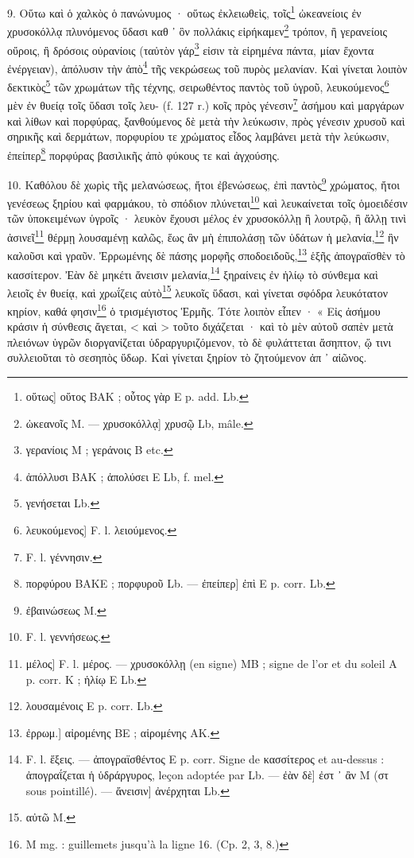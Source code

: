 \documentclass[a4paper, 11pt, oneside, polutonikogreek, french]{article}
\begin{document}
9. Οὕτω καὶ ὁ χαλκὸς ὁ πανώνυμος · οὕτως ἐκλειωθεὶς, τοῖς\footnote{οὕτως] οὕτος BAK ; οὗτος γὰρ E p. add. Lb.} ὠκεανείοις ἐν χρυσοκόλλᾳ πλυνόμενος ὕδασι καθ ᾽ ὃν πολλάκις εἰρήκαμεν\footnote{ὠκεανοῖς M. --- χρυσοκόλλᾳ] χρυσῷ Lb, mâle.} τρόπον, ἢ γερανείοις οὔροις, ἢ δρόσοις οὐρανίοις (ταὐτὸν γάρ\footnote{γερανίοις M ; γεράνοις B etc.} εἰσιν τὰ εἰρημένα πάντα, μίαν ἔχοντα ἐνέργειαν), ἀπόλυσιν τὴν ἀπὸ\footnote{ἀπόλλυσι BAK ; ἀπολύσει E Lb, f. mel.} τῆς νεκρώσεως τοῦ πυρὸς μελανίαν. Καὶ γίνεται λοιπὸν δεκτικὸς\footnote{γενήσεται Lb.} τῶν χρωμάτων τῆς τέχνης, σειρωθέντος παντὸς τοῦ ὑγροῦ, λευκούμενος\footnote{λευκούμενος] F. l. λειούμενος.} μὲν ἐν θυείᾳ τοῖς ὕδασι τοῖς λευ- (f. 127 r.) κοῖς πρὸς γένεσιν\footnote{F. l. γέννησιν.} ἀσήμου καὶ μαργάρων καὶ λίθων καὶ πορφύρας, ξανθούμενος δὲ μετὰ τὴν λεύκωσιν, πρὸς γένεσιν χρυσοῦ καὶ σηρικῆς καὶ δερμάτων, πορφυρίου τε χρώματος εἶδος λαμβάνει μετὰ τὴν λεύκωσιν, ἐπείπερ\footnote{πορφύρου BAKE ; πορφυροῦ Lb. --- ἐπείπερ] ἐπὶ E p. corr. Lb.} πορφύρας βασιλικῆς ἀπὸ φύκους τε καὶ ἀγχούσης.

10. Καθόλου δὲ χωρὶς τῆς μελανώσεως, ἤτοι ἐβενώσεως, ἐπὶ παντὸς\footnote{ἐβαινώσεως M.} χρώματος, ἤτοι γενέσεως ξηρίου καὶ φαρμάκου, τὸ σπόδιον πλύνεται\footnote{F. l. γεννήσεως.} καὶ λευκαίνεται τοῖς ὁμοειδέσιν τῶν ὑποκειμένων ὑγροῖς · λευκὸν ἔχουσι μέλος ἐν χρυσοκόλλῃ ἢ λουτρῷ, ἢ ἄλλῃ τινὶ ἀσινεῖ\footnote{μέλος] F. l. μέρος. --- χρυσοκόλλῃ (en signe) MB ; signe de l'or et du soleil A p. corr. K ; ἡλίῳ E Lb.} θέρμῃ λουσαμένῃ καλῶς, ἕως ἂν μὴ ἐπιπολάσῃ τῶν ὑδάτων ἡ μελανία,\footnote{λουσαμένοις E p. corr. Lb.} ἣν καλοῦσι καὶ γραῦν. Ἐρρωμένης δὲ πάσης μορφῆς σποδοειδοῦς,\footnote{ἐρρωμ.] αἰρομένης BE ; αἱρομένης AK.} ἑξῆς ἀπογραϊσθὲν τὸ κασσίτερον. Ἐὰν δὲ μηκέτι ἄνεισιν μελανία,\footnote{F. l. ἕξεις. --- ἀπογραϊσθέντος E p. corr. Signe de κασσίτερος et au-dessus : ἀπογραΐζεται ἡ ὑδράργυρος, leçon adoptée par Lb. --- ἐὰν δὲ] ἐστ ᾽ ἂν M (στ sous pointillé). --- ἄνεισιν] ἀνέρχηται Lb.} ξηραίνεις ἐν ἡλίῳ τὸ σύνθεμα καὶ λειοῖς ἐν θυείᾳ, καὶ χρωΐζεις αὐτὸ\footnote{αὐτῶ M.} λευκοῖς ὕδασι, καὶ γίνεται σφόδρα λευκότατον κηρίον, καθά φησιν\footnote{M mg. : guillemets jusqu'à la ligne 16. (Cp. 2, 3, 8.)} ὁ τρισμέγιστος Ἑρμῆς. Τότε λοιπὸν εἶπεν · « Εἰς ἀσήμου κράσιν ἡ σύνθεσις ἄγεται, < καὶ > τοῦτο διχάζεται · καὶ τὸ μὲν αὐτοῦ σαπὲν μετὰ πλειόνων ὑγρῶν διοργανίζεται ὑδραργυριζόμενον, τὸ δὲ φυλάττεται ἄσηπτον, ᾥ τινι συλλειοῦται τὸ σεσηπὸς ὕδωρ. Καὶ γίνεται ξηρίον τὸ ζητούμενον ἀπ ᾽ αἰῶνος.
\end{document}
